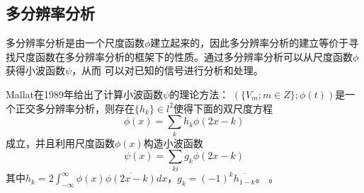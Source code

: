 \subsection{多分辨率分析}
多分辨率分析是由一个尺度函数$\phi$建立起来的，因此多分辨率分析的建立等价于寻找尺度函数在多分辨率分析的框架下的性质。通过多分辨率分析可以从尺度函数$\phi$获得小波函数$\psi$，从而
可以对已知的信号进行分析和处理。
\par Mallat在1989年给出了计算小波函数$\psi$的理论方法：
$(\{ V_{m};m\in Z\} ;\phi(t))$是一个正交多分辨率分析，则存在$\{ h_{k} \}\in l^{2}$使得下面的双尺度方程
\begin{equation}
	\phi(x) = \sum_{k}h_{k}\phi(2x-k)
\end{equation}
成立，并且利用尺度函数$\phi(x)$构造小波函数
\begin{equation}
	\psi(x)=\sum_{ki}g_{k}\phi(2x-k)
\end{equation}
其中$h_{k}=2\int_{-\infty}^{\infty}\phi(x)\overline{\phi(2x-k)}dx$，$g_{k}=(-1)^{k}\overline{h_{1-k}}$。
。
